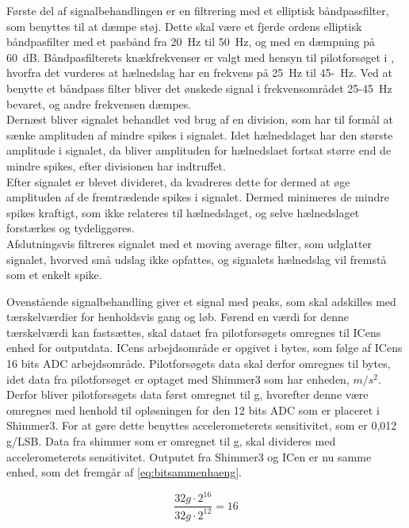 Første del af signalbehandlingen er en filtrering med et elliptisk båndpassfilter, som benyttes til at dæmpe støj. Dette skal være et fjerde ordens elliptisk båndpasfilter med et pasbånd fra 20~Hz til 50~Hz, og med en dæmpning på 60~dB. Båndpasfilterets knækfrekvenser er valgt med hensyn til pilotforsøget i , hvorfra det vurderes at hælnedslag har en frekvens på 25~Hz til 45-~Hz. Ved at benytte et båndpass filter bliver det ønskede signal i frekvensområdet 25-45~Hz bevaret, og andre frekvensen dæmpes.\\
Dernæst bliver signalet behandlet ved brug af en division, som har til formål at sænke amplituden af mindre spikes i signalet. Idet hælnedslaget har den største amplitude i signalet, da bliver amplituden for hælnedslaet fortsat større end de mindre spikes, efter divisionen har indtruffet. \\
Efter signalet er blevet divideret, da kvadreres dette for dermed at øge amplituden af de fremtrædende spikes i signalet. Dermed minimeres de mindre spikes kraftigt, som ikke relateres til hælnedslaget, og selve hælnedslaget forstærkes og tydeliggøres. \\
Afslutningsvis filtreres signalet med et moving average filter, som udglatter signalet, hvorved små udslag ikke opfattes, og signalets hælnedslag vil fremstå som et enkelt spike.

Ovenstående signalbehandling giver et signal med peaks, som skal adskilles med tærskelværdier for henholdsvis gang og løb. Førend en værdi for denne tærskelværdi kan fastsættes, skal dataet fra pilotforsøgets omregnes til ICens enhed for outputdata. ICens arbejdsområde er opgivet i bytes, som følge af ICens 16 bits ADC arbejdsområde. Pilotforsøgets data skal derfor omregnes til bytes, idet data fra pilotforsøget er optaget med Shimmer3 som har enheden, $m/s^{2}$. Derfor bliver pilotforsøgets data først omregnet til g, hvorefter denne være omregnes med henhold til opløsningen for den 12 bits ADC som er placeret i Shimmer3. For at gøre dette benyttes accelerometerets sensitivitet, som er 0,012 g/LSB. Data fra shimmer som er omregnet til g, skal divideres med accelerometerets sensitivitet. Outputet fra Shimmer3 og ICen er nu samme enhed, som det fremgår af \eqref{eq:bitsammenhaeng}.
 
\begin{equation}
\frac{32 g \cdot 2^{16}}{32 g \cdot 2^{12}} = 16
\label{eq:bitsammenhaeng}
\end{equation}

